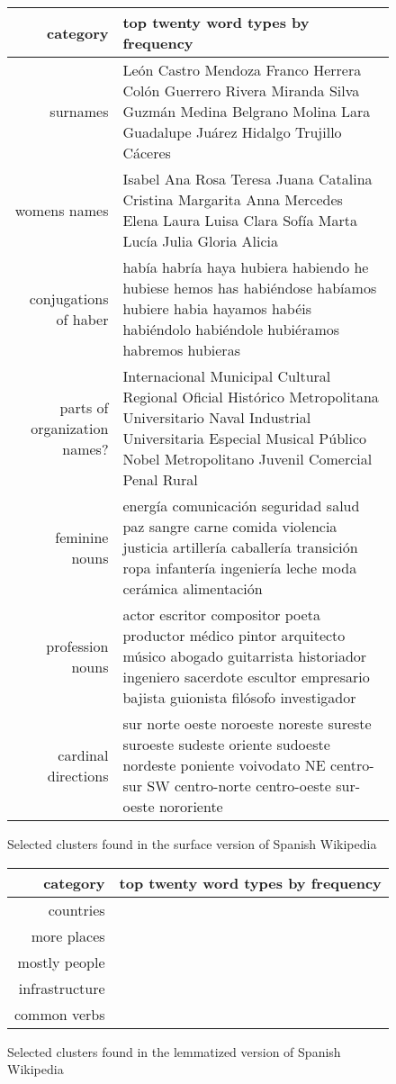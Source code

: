 \begin{figure*}[t!]
  \begin{tabular}{|r|p{10cm}|}
    \hline
    category  & top twenty word types by frequency \\
    \hline
    surnames & León Castro Mendoza Franco Herrera Colón Guerrero Rivera Miranda
    Silva Guzmán Medina Belgrano Molina Lara Guadalupe Juárez Hidalgo Trujillo
    Cáceres \\
    \hline
    womens names & Isabel Ana Rosa Teresa Juana Catalina Cristina Margarita
    Anna Mercedes Elena Laura Luisa Clara Sofía Marta Lucía Julia Gloria Alicia
    \\
    \hline
    conjugations of haber & había habría haya hubiera habiendo he hubiese hemos
    has habiéndose habíamos hubiere habia hayamos habéis habiéndolo habiéndole
    hubiéramos habremos hubieras \\
    \hline
    parts of organization names? & Internacional Municipal Cultural Regional
    Oficial Histórico Metropolitana Universitario Naval Industrial
    Universitaria Especial Musical Público Nobel Metropolitano Juvenil
    Comercial Penal Rural \\
    \hline
    feminine nouns & energía comunicación seguridad salud paz sangre carne
    comida violencia justicia artillería caballería transición ropa infantería
    ingeniería leche moda cerámica alimentación \\
    \hline
    profession nouns & actor escritor compositor poeta productor médico pintor
    arquitecto músico abogado guitarrista historiador ingeniero sacerdote
    escultor empresario bajista guionista filósofo investigador \\
    \hline
    cardinal directions & sur norte oeste noroeste noreste sureste suroeste
    sudeste oriente sudoeste nordeste poniente voivodato NE centro-sur SW
    centro-norte centro-oeste sur-oeste nororiente \\
    \hline
  \end{tabular}
\caption{Selected clusters found in the surface version of Spanish Wikipedia}
\label{fig:clusters-wikipedia-surface}
\end{figure*}

\begin{figure*}[t!]
  \begin{tabular}{|r|p{10cm}|}
    \hline
    category  & top twenty word types by frequency \\
    \hline
    countries &  \\
    \hline
    more places & \\
    \hline
    mostly people & \\
    \hline
    infrastructure & \\
    \hline
    common verbs & \\
    \hline
  \end{tabular}
\caption{Selected clusters found in the lemmatized version of Spanish Wikipedia}
\label{fig:clusters-wikipedia-lemma}
\end{figure*}

